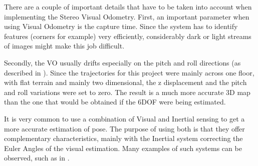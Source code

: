 \documentclass[11pt]{article}
\begin{document}
There are a couple of important details that have to be taken into account when implementing the Stereo Visual Odometry. First, an important parameter when using Visual Odometry is the capture time. Since the system has to identify features (corners for example) very efficiently, considerably dark or light streams of images might make this job difficult.  
	
Secondly, the VO usually drifts especially on the pitch and roll directions (as described in \cite{usenko2016direct}). Since the trajectories for this project were mainly across one floor, with flat terrain and mainly two dimensional, the z displacement and the pitch and roll variations were set to zero. The result is a much more accurate 3D map than the one that would be obtained if the 6DOF were being estimated.
	
It is very common to use a combination of Visual and Inertial sensing to get a more accurate estimation of pose. The purpose of using both is that they offer complementary characteristics, mainly with the Inertial system correcting the Euler Angles of the visual estimation. Many examples of such systems can be observed, such as in \cite{usenko2016direct}.
	
\end{document}
